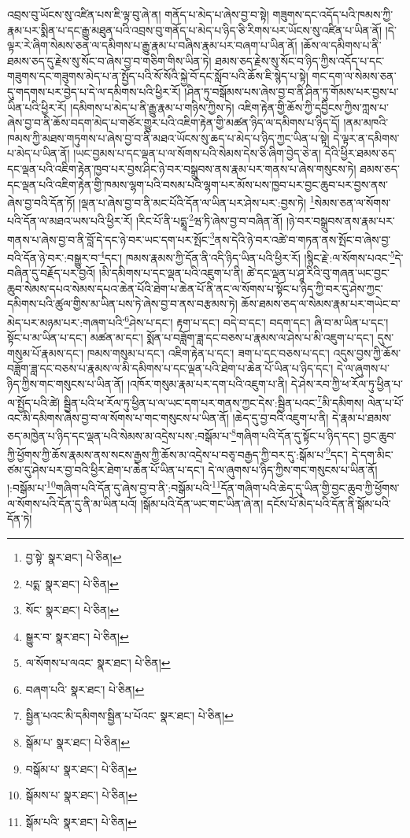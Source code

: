 འབྲས་བུ་ཡོངས་སུ་འཛིན་པས་ཇི་ལྟ་བུ་ཞེ་ན། གནོད་པ་མེད་པ་ཞེས་བྱ་བ་སྟེ། གཟུགས་དང་འདོད་པའི་ཁམས་ཀྱི་རྣམ་པར་སྨིན་པ་དང་རྒྱུ་མཐུན་པའི་འབྲས་བུ་གནོད་པ་མེད་པ་ཉིད་ཅི་རིགས་པར་ཡོངས་སུ་འཛིན་པ་ཡིན་ནོ། །དེ་ལྟར་རེ་ཞིག་སེམས་ཅན་ལ་དམིགས་པ་རྒྱུ་རྣམ་པ་བཞིས་རྣམ་པར་བཞག་པ་ཡིན་ནོ། །ཆོས་ལ་དམིགས་པ་ནི་ཐམས་ཅད་དུ་རྗེས་སུ་སོང་བ་ཞེས་བྱ་བ་གཅིག་གིས་ཡིན་ཏེ། ཐམས་ཅད་རྗེས་སུ་སོང་བ་ཉིད་ཀྱིས་འདོད་པ་དང་གཟུགས་དང་གཟུགས་མེད་པ་ན་སྤྱོད་པའི་སོ་སོའི་སྐྱེ་བོ་དང་སློབ་པའི་ཆོས་ཇི་སྙེད་པ་སྟེ། གང་དག་ལ་སེམས་ཅན་དུ་གདགས་པར་བྱེད་པ་དེ་ལ་དམིགས་པའི་ཕྱིར་རོ། །ཤིན་ཏུ་བསྒོམས་པས་ཞེས་བྱ་བ་ནི་ཤིན་ཏུ་གོམས་པར་བྱས་པ་ཡིན་པའི་ཕྱིར་རོ། །དམིགས་པ་མེད་པ་ནི་རྒྱུ་རྣམ་པ་གཉིས་ཀྱིས་ཏེ། འཇིག་རྟེན་གྱི་ཆོས་ཀྱི་དབྱིངས་ཀྱིས་ཀླས་པ་ཞེས་བྱ་བ་ནི་ཆོས་བདག་མེད་པ་གཙོར་གྱུར་པའི་འཇིག་རྟེན་གྱི་མཚན་ཉིད་ལ་དམིགས་པ་ཉིད་དོ། །ནམ་མཁའི་ཁམས་ཀྱི་མཐས་གཏུགས་པ་ཞེས་བྱ་བ་ནི་མཐའ་ཡོངས་སུ་ཆད་པ་མེད་པ་ཉིད་ཀྱང་ཡིན་པ་སྟེ། དེ་ལྟར་ན་དམིགས་པ་མེད་པ་ཡིན་ནོ། །ཡང་བྱམས་པ་དང་ལྡན་པ་ལ་སོགས་པའི་སེམས་དེས་ཅི་ཞིག་བྱེད་ཅེ་ན། དེའི་ཕྱིར་ཐམས་ཅད་དང་ལྡན་པའི་འཇིག་རྟེན་ཁྱབ་པར་བྱས་ཤིང་ཉེ་བར་བསྒྲུབས་ནས་རྣམ་པར་གནས་པ་ཞེས་གསུངས་ཏེ། ཐམས་ཅད་དང་ལྡན་པའི་འཇིག་རྟེན་གྱི་ཁམས་ལྷག་པའི་བསམ་པའི་ལྷག་པར་མོས་པས་ཁྱབ་པར་བྱང་ཆུབ་པར་བྱས་ནས་ཞེས་བྱ་བའི་དོན་ཏོ། །ལྡན་པ་ཞེས་བྱ་བ་ནི་མང་པོའི་དོན་ལ་ཡིན་པར་ཤེས་པར་:བྱས་ཏེ། \footnote{བྱ་སྟེ་  སྣར་ཐང་།  པེ་ཅིན། }སེམས་ཅན་ལ་སོགས་པའི་དོན་ལ་མཐའ་ཡས་པའི་ཕྱིར་རོ། །རིང་པོ་ནི་པདྨཱ་\footnote{པདྨ་  སྣར་ཐང་།  པེ་ཅིན། }ཝ་ཏི་ཞེས་བྱ་བ་བཞིན་ནོ། །ཉེ་བར་བསྒྲུབས་ནས་རྣམ་པར་གནས་པ་ཞེས་བྱ་བ་ནི་བློ་དེ་དང་ཉེ་བར་ཡང་དག་པར་སྤོང་\footnote{སོང་  སྣར་ཐང་།  པེ་ཅིན། }ནས་དེའི་ཉེ་བར་འཚེ་བ་གཏན་ནས་སྤོང་བ་ཞེས་བྱ་བའི་དོན་ཉེ་བར་:བསྒྱུར་བ་\footnote{སྒྱུར་བ་  སྣར་ཐང་།  པེ་ཅིན། }དང་། ཁམས་རྣམས་ཀྱི་དོན་ནི་འདི་ཉིད་ཡིན་པའི་ཕྱིར་རོ། །སྙིང་རྗེ་:ལ་སོགས་པའང་\footnote{ལ་སོགས་པ་ལའང་  སྣར་ཐང་།  པེ་ཅིན། }དེ་བཞིན་དུ་བརྗོད་པར་བྱའོ། །མི་དམིགས་པ་དང་ལྡན་པའི་འཇུག་པ་ནི། ཚེ་དང་ལྡན་པ་ཤཱ་རིའི་བུ་གཞན་ཡང་བྱང་ཆུབ་སེམས་དཔའ་སེམས་དཔའ་ཆེན་པོའི་ཐེག་པ་ཆེན་པོ་ནི་ནང་ལ་སོགས་པ་སྟོང་པ་ཉིད་ཀྱི་བར་དུ་ཤེས་ཀྱང་དམིགས་པའི་ཚུལ་གྱིས་མ་ཡིན་པས་ཏེ་ཞེས་བྱ་བ་ནས་བརྩམས་ཏེ། ཆོས་ཐམས་ཅད་ལ་སེམས་རྣམ་པར་གཡེང་བ་མེད་པར་མཉམ་པར་:གཞག་པའི་\footnote{བཞག་པའི་  སྣར་ཐང་།  པེ་ཅིན། }ཤེས་པ་དང་། རྟག་པ་དང་། བདེ་བ་དང་། བདག་དང་། ཞི་བ་མ་ཡིན་པ་དང་། སྟོང་པ་མ་ཡིན་པ་དང་། མཚན་མ་དང་། སྨོན་པ་བཟློག་ཟླ་དང་བཅས་པ་རྣམས་ལ་ཤེས་པ་མི་འཇུག་པ་དང་། དུས་གསུམ་པོ་རྣམས་དང་། ཁམས་གསུམ་པ་དང་། འཇིག་རྟེན་པ་དང་། ཟག་པ་དང་བཅས་པ་དང་། འདུས་བྱས་ཀྱི་ཆོས་བཟློག་ཟླ་དང་བཅས་པ་རྣམས་ལ་མི་དམིགས་པ་དང་ལྡན་པའི་ཐེག་པ་ཆེན་པོ་ཡིན་པ་ཉིད་དང་། དེ་ལ་ཞུགས་པ་ཉིད་ཀྱིས་གང་གསུངས་པ་ཡིན་ནོ། །འཁོར་གསུམ་རྣམ་པར་དག་པའི་འཇུག་པ་ནི། དེ་ཤེས་རབ་ཀྱི་ཕ་རོལ་ཏུ་ཕྱིན་པ་ལ་སྤྱོད་པའི་ཚེ། སྦྱིན་པའི་ཕ་རོལ་ཏུ་ཕྱིན་པ་ལ་ཡང་དག་པར་གནས་ཀྱང་དེས་:སྦྱིན་པའང་\footnote{སྦྱིན་པའང་མི་དམིགས་སྦྱིན་པ་པོའང་  སྣར་ཐང་།  པེ་ཅིན། }མི་དམིགས། ལེན་པ་པོ་འང་མི་དམིགས་ཞེས་བྱ་བ་ལ་སོགས་པ་གང་གསུངས་པ་ཡིན་ནོ། །ཆེད་དུ་བྱ་བའི་འཇུག་པ་ནི། དེ་རྣམ་པ་ཐམས་ཅད་མཁྱེན་པ་ཉིད་དང་ལྡན་པའི་སེམས་མ་འདྲེས་པས་:བསྒོམ་པ་\footnote{སྒོམ་པ་  སྣར་ཐང་།  པེ་ཅིན། }གཞིག་པའི་དོན་དུ་སྟོང་པ་ཉིད་དང་། བྱང་ཆུབ་ཀྱི་ཕྱོགས་ཀྱི་ཆོས་རྣམས་ནས་སངས་རྒྱས་ཀྱི་ཆོས་མ་འདྲེས་པ་བཅྭ་བརྒྱད་ཀྱི་བར་དུ་:སྒོམ་པ་\footnote{བསྒོམ་པ་  སྣར་ཐང་།  པེ་ཅིན། }དང་། དེ་དག་མིང་ཙམ་དུ་ཤེས་པར་བྱ་བའི་ཕྱིར་ཐེག་པ་ཆེན་པོ་ཡིན་པ་དང་། དེ་ལ་ཞུགས་པ་ཉིད་ཀྱིས་གང་གསུངས་པ་ཡིན་ནོ། །:བསྒོམ་པ་\footnote{སྒོམས་པ་  སྣར་ཐང་།  པེ་ཅིན། }གཞིག་པའི་དོན་དུ་ཞེས་བྱ་བ་ནི་:བསྒོམ་པའི་\footnote{སྒོམ་པའི་  སྣར་ཐང་།  པེ་ཅིན། }དོན་གཞིག་པའི་ཆེད་དུ་ཡིན་གྱི་བྱང་ཆུབ་ཀྱི་ཕྱོགས་ལ་སོགས་པའི་དོན་དུ་ནི་མ་ཡིན་པའོ། །སྒོམ་པའི་དོན་ཡང་གང་ཡིན་ཞེ་ན། དངོས་པོ་མེད་པའི་དོན་ནི་སྒོམ་པའི་དོན་ཏེ། 